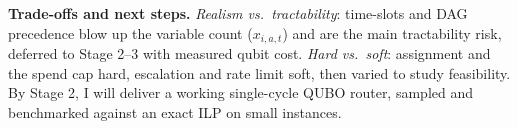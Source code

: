 \documentclass{article}
\begin{document}
\textbf{Trade-offs and next steps.} \emph{Realism vs.\ tractability}: time-slots and DAG precedence blow up the variable count ($x_{i,a,t}$) and are the main tractability risk, deferred to Stage 2--3 with measured qubit cost. \emph{Hard vs.\ soft}: assignment and the spend cap hard, escalation and rate limit soft, then varied to study feasibility. By Stage 2, I will deliver a working single-cycle QUBO router, sampled and benchmarked against an exact ILP on small instances.



\end{document}
